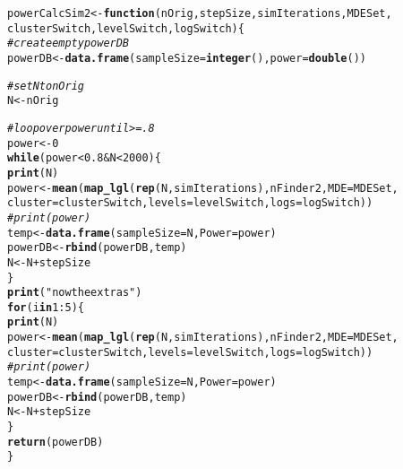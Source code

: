 \documentclass[10pt]{article}\usepackage[]{graphicx}\usepackage[]{color}
\makeatletter
\newcommand{\hlnum}[1]{\textcolor[rgb]{0.686,0.059,0.569}{#1}}%
\newcommand{\hlstr}[1]{\textcolor[rgb]{0.192,0.494,0.8}{#1}}%
\newcommand{\hlcom}[1]{\textcolor[rgb]{0.678,0.584,0.686}{\textit{#1}}}%
\newcommand{\hlopt}[1]{\textcolor[rgb]{0,0,0}{#1}}%
\newcommand{\hlstd}[1]{\textcolor[rgb]{0.345,0.345,0.345}{#1}}%
\newcommand{\hlkwa}[1]{\textcolor[rgb]{0.161,0.373,0.58}{\textbf{#1}}}%
\newcommand{\hlkwb}[1]{\textcolor[rgb]{0.69,0.353,0.396}{#1}}%
\newcommand{\hlkwc}[1]{\textcolor[rgb]{0.333,0.667,0.333}{#1}}%
\newcommand{\hlkwd}[1]{\textcolor[rgb]{0.737,0.353,0.396}{\textbf{#1}}}%
\newenvironment{kframe}{%
 \def\at@end@of@kframe{}%
 \ifinner\ifhmode%
  \def\at@end@of@kframe{\end{minipage}}%
  \begin{minipage}{\columnwidth}%
 \fi\fi%
 \def\FrameCommand##1{\hskip\@totalleftmargin \hskip-\fboxsep
 \colorbox{shadecolor}{##1}\hskip-\fboxsep
     \hskip-\linewidth \hskip-\@totalleftmargin \hskip\columnwidth}%
 \MakeFramed {\advance\hsize-\width
   \@totalleftmargin\z@ \linewidth\hsize
   \@setminipage}}%
 {\par\unskip\endMakeFramed%
 \at@end@of@kframe}
\newenvironment{knitrout}{}{} %
\makeatother
\begin{document}
\begin{knitrout}
\color{fgcolor}\begin{kframe}
\begin{alltt}
\hlstd{powerCalcSim2} \hlkwb{<-} \hlkwa{function}\hlstd{(}\hlkwc{nOrig}\hlstd{,} \hlkwc{stepSize}\hlstd{,} \hlkwc{simIterations}\hlstd{,} \hlkwc{MDESet}\hlstd{,}
                         \hlkwc{clusterSwitch}\hlstd{,} \hlkwc{levelSwitch}\hlstd{,} \hlkwc{logSwitch}\hlstd{)\{}
  \hlcom{# create empty powerDB}
  \hlstd{powerDB} \hlkwb{<-} \hlkwd{data.frame}\hlstd{(}\hlkwc{sampleSize} \hlstd{=} \hlkwd{integer}\hlstd{(),} \hlkwc{power} \hlstd{=} \hlkwd{double}\hlstd{())}

  \hlcom{# set N to nOrig }
  \hlstd{N} \hlkwb{<-} \hlstd{nOrig}

  \hlcom{# loop over power until >=.8}
  \hlstd{power} \hlkwb{<-} \hlnum{0}
  \hlkwa{while}\hlstd{(power} \hlopt{<} \hlnum{0.8} \hlopt{&} \hlstd{N} \hlopt{<} \hlnum{2000}\hlstd{)\{}
  \hlkwd{print}\hlstd{(N)}
  \hlstd{power} \hlkwb{<-} \hlkwd{mean}\hlstd{(}\hlkwd{map_lgl}\hlstd{(}\hlkwd{rep}\hlstd{(N,simIterations),nFinder2,} \hlkwc{MDE} \hlstd{= MDESet,}
                        \hlkwc{cluster} \hlstd{= clusterSwitch,} \hlkwc{levels} \hlstd{= levelSwitch,} \hlkwc{logs} \hlstd{= logSwitch))}
  \hlcom{#print(power)}
  \hlstd{temp} \hlkwb{<-} \hlkwd{data.frame}\hlstd{(}\hlkwc{sampleSize} \hlstd{= N,} \hlkwc{Power} \hlstd{= power)}
  \hlstd{powerDB} \hlkwb{<-} \hlkwd{rbind}\hlstd{(powerDB, temp)}
  \hlstd{N} \hlkwb{<-} \hlstd{N} \hlopt{+} \hlstd{stepSize}
  \hlstd{\}}
  \hlkwd{print}\hlstd{(}\hlstr{"now the extras"}\hlstd{)}
  \hlkwa{for}\hlstd{(i} \hlkwa{in} \hlnum{1}\hlopt{:}\hlnum{5}\hlstd{)\{}
  \hlkwd{print}\hlstd{(N)}
  \hlstd{power} \hlkwb{<-} \hlkwd{mean}\hlstd{(}\hlkwd{map_lgl}\hlstd{(}\hlkwd{rep}\hlstd{(N,simIterations),nFinder2,} \hlkwc{MDE} \hlstd{= MDESet,}
                        \hlkwc{cluster} \hlstd{= clusterSwitch,} \hlkwc{levels} \hlstd{= levelSwitch,} \hlkwc{logs} \hlstd{= logSwitch))}
  \hlcom{#print(power)}
  \hlstd{temp} \hlkwb{<-} \hlkwd{data.frame}\hlstd{(}\hlkwc{sampleSize} \hlstd{= N,} \hlkwc{Power} \hlstd{= power)}
  \hlstd{powerDB} \hlkwb{<-} \hlkwd{rbind}\hlstd{(powerDB, temp)}
  \hlstd{N} \hlkwb{<-} \hlstd{N} \hlopt{+} \hlstd{stepSize}
  \hlstd{\}}
  \hlkwd{return}\hlstd{(powerDB)}
\hlstd{\}}
\end{alltt}
\end{kframe}
\end{knitrout}
\end{document}
